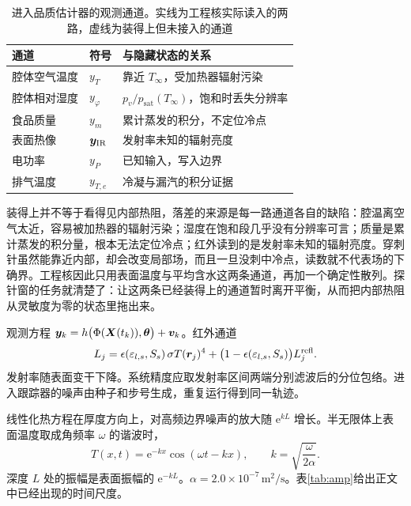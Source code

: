 \begin{table}[htbp]
\centering
\caption{进入品质估计器的观测通道。实线为工程核实际读入的两路，虚线为装得上但未接入的通道}
\label{tab:obs}
\setlength{\tabcolsep}{2.2pt}
{\footnotesize
\begin{tabularx}{\columnwidth}{llY}
\toprule
通道 & 符号 & 与隐藏状态的关系 \\
\midrule
腔体空气温度 & \(y_T\) & 靠近 \(T_\infty\)，受加热器辐射污染 \\
腔体相对湿度 & \(y_\varphi\) & \(p_v/p_{\mathrm{sat}}(T_\infty)\)，饱和时丢失分辨率 \\
食品质量 & \(y_m\) & 累计蒸发的积分，不定位冷点 \\
表面热像 & \(\bm{y}_{\mathrm{IR}}\) & 发射率未知的辐射亮度 \\
电功率 & \(y_P\) & 已知输入，写入边界 \\
排气温度 & \(y_{T,e}\) & 冷凝与漏汽的积分证据 \\
\bottomrule
\end{tabularx}}
\end{table}

装得上并不等于看得见内部热阻，落差的来源是每一路通道各自的缺陷：腔温离空气太近，容易被加热器的辐射污染；湿度在饱和段几乎没有分辨率可言；质量是累计蒸发的积分量，根本无法定位冷点；红外读到的是发射率未知的辐射亮度。穿刺针虽然能靠近内部，却会改变局部场，而且一旦没刺中冷点，读数就不代表场的下确界。工程核因此只用表面温度与平均含水这两条通道，再加一个确定性散列。探针窗的任务就清楚了：让这两条已经装得上的通道暂时离开平衡，从而把内部热阻从灵敏度为零的状态里拖出来。

观测方程 \(\bm{y}_k=h\big(\Phi(\bm{X}(t_k)),\bm{\theta}\big)+\bm{v}_k\)。红外通道
\[
L_j=\epsilon(\varepsilon_{l,s},S_s)\,\sigma T(\bm{r}_j)^4
+\big(1-\epsilon(\varepsilon_{l,s},S_s)\big)L_j^{\mathrm{refl}}.
\]
发射率随表面变干下降。系统精度应取发射率区间两端分别滤波后的分位包络。进入跟踪器的噪声由种子和步号生成，重复运行得到同一轨迹。

线性化热方程在厚度方向上，对高频边界噪声的放大随 \(\mathrm{e}^{kL}\) 增长\cite{ozisik2000}。半无限体上表面温度取成角频率 \(\omega\) 的谐波时，
\begin{equation}
\label{eq:halfspace}
T(x,t)=\mathrm{e}^{-kx}\cos(\omega t-kx),\qquad
k=\sqrt{\frac{\omega}{2\alpha}}.
\end{equation}
深度 \(L\) 处的振幅是表面振幅的 \(\mathrm{e}^{-kL}\)。\(\alpha=2.0\times 10^{-7}\,\mathrm{m}^2/\mathrm{s}\)。表\ref{tab:amp}{}给出正文中已经出现的时间尺度。

